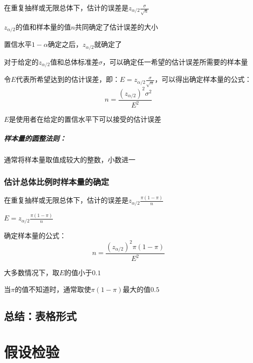 \documentclass[UTF8,10pt]{book}
\begin{document}
                {\kaishu 在重复抽样或无限总体下，估计的误差是$z_{\alpha/2}  \frac{\sigma}{\sqrt{n}}$
                
                $z_{\alpha/2}$的值和样本量的值$n$共同确定了估计误差的大小
                
                置信水平$1-\alpha$确定之后，$z_{\alpha/2}$就确定了
                
                对于给定的$z_{\alpha/2}$值和总体标准差$\sigma$，可以确定任一希望的估计误差所需要的样本量}

                令$E$代表所希望达到的估计误差，即：$E = z_{\alpha/2}  \frac{\sigma}{\sqrt{n}}$，可以得出确定样本量的公式：
                    $$ n =  \frac{(z_{\alpha/2})^2 \sigma^2}{E^2}$$

                $E$是使用者在给定的置信水平下可以接受的估计误差

                \paragraph{样本量的圆整法则：}通常将样本量取值成较大的整数，小数进一

            \subsection{估计总体比例时样本量的确定}
                    
            {\kaishu 在重复抽样或无限总体下，估计的误差是$z_{\alpha/2}  \frac{\pi(1-\pi)}{n}$

            $E = z_{\alpha/2}  \frac{\pi(1-\pi)}{n}$}

            确定样本量的公式：
                $$ n =  \frac{(z_{\alpha/2})^2 \pi (1-\pi)}{E^2}$$

            {\kaishu 大多数情况下，取$E$的值小于$0.1$
            
            当$\pi$的值不知道时，通常取使$\pi(1-\pi)$最大的值$0.5$}

        \section{总结：表格形式}


\clearpage
\chapter{假设检验}
\end{document}

